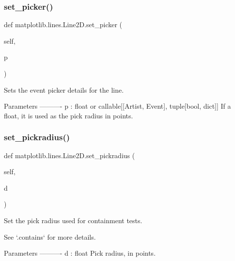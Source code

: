 \subsubsection{\texorpdfstring{set\+\_\+picker()}{set\_picker()}}
{\footnotesize\ttfamily def matplotlib.\+lines.\+Line2\+D.\+set\+\_\+picker (\begin{DoxyParamCaption}\item[{}]{self,  }\item[{}]{p }\end{DoxyParamCaption})}

\begin{DoxyVerb}Sets the event picker details for the line.

Parameters
----------
p : float or callable[[Artist, Event], tuple[bool, dict]]
    If a float, it is used as the pick radius in points.
\end{DoxyVerb}
 \mbox{\label{classmatplotlib_1_1lines_1_1Line2D_a55175911cf70d74606fcefd4047c8321}} 
\subsubsection{\texorpdfstring{set\+\_\+pickradius()}{set\_pickradius()}}
{\footnotesize\ttfamily def matplotlib.\+lines.\+Line2\+D.\+set\+\_\+pickradius (\begin{DoxyParamCaption}\item[{}]{self,  }\item[{}]{d }\end{DoxyParamCaption})}

\begin{DoxyVerb}Set the pick radius used for containment tests.

See `.contains` for more details.

Parameters
----------
d : float
    Pick radius, in points.
\end{DoxyVerb}
 \mbox{\label{classmatplotlib_1_1lines_1_1Line2D_aa7d782e772dbdf4391e90449a15b4bf0}} 
